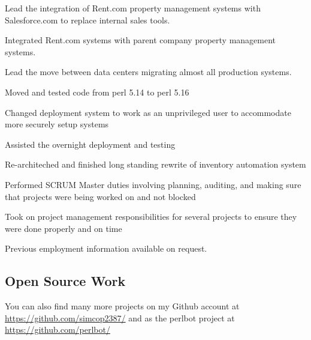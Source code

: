 \documentclass[table,tmargin=1in,bmargin=1in,letterpaper]{resume}
\begin{document}
\begin{compactitem}
\item Lead the integration of Rent.com property management systems with Salesforce.com to replace internal sales tools.
\item Integrated Rent.com systems with parent company property management systems.
\item Lead the move between data centers migrating almost all production systems.
  \begin{compactitem}
  \item Moved and tested code from perl 5.14 to perl 5.16
  \item Changed deployment system to work as an unprivileged user to accommodate more securely setup systems
  \item Assisted the overnight deployment and testing
  \end{compactitem}
\item Re-architeched and finished long standing rewrite of inventory automation system
\item Performed SCRUM Master duties involving planning, auditing, and making sure that projects were being worked on and not blocked
\item Took on project management responsibilities for several projects to ensure they were done properly and on time
\end{compactitem}

Previous employment information available on request.

\vspace{0.2in}

\subsection{Open Source Work}

\begin{compactitem}
\item You can also find many more projects on my Github account at \url{https://github.com/simcop2387/} and as the perlbot project at \url{https://github.com/perlbot/}
\end{compactitem}
\end{document}
